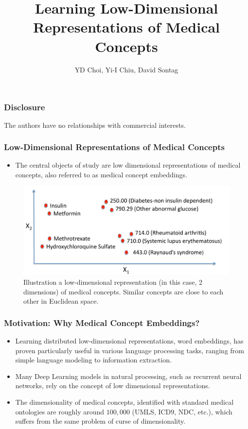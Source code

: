 \documentclass{beamer}
\title{Learning Low-Dimensional Representations
of Medical Concepts \\
}
\author{YD Choi, Yi-I Chiu, David Sontag }
\institute{Courant Institute of Mathematical 
Sciences, New York University}
\begin{document}
 
\frame{\titlepage} 

\begin{frame}
\frametitle{Disclosure}
\begin{center}
The authors have no relationships 
with commercial interests.
\end{center}
\end{frame}

\begin{frame}
\frametitle{Low-Dimensional Representations of 
Medical Concepts}
\begin{center}
\begin{itemize}
\item The central objects of study are
low dimensional representations of medical 
concepts, also referred to as medical concept
embeddings.
\end{itemize}
\bigskip

\begin{figure}[t]
    \centering 
    \includegraphics[width=.6\linewidth]{figs/illustration_of_embeddings.pdf}
    \caption{\centering 
\scriptsize Illustration a low-dimensional representation (in
      this case, 2 dimensions) of medical concepts. Similar concepts are close to each other in Euclidean space.
\label{fig:illustration_of_embeddings}}
\end{figure}
\end{center}
\end{frame}

\begin{frame}
\frametitle{Motivation: Why Medical Concept Embeddings?}
\begin{center}
\begin{itemize}
\item 
Learning distributed low-dimensional representations,
word embeddings, has proven particularly useful
in various language processing tasks, ranging from
simple language modeling to information extraction.

\bigskip

\item Many Deep Learning models in natural processing,
such as recurrent neural networks, 
rely on the concept of 
low dimensional representations.

\bigskip

\item The dimensionality of medical concepts, 
identified with standard medical ontologies are
roughly around $100,000$ (UMLS, ICD9, NDC, etc.),
which 
suffers from the same problem of curse of dimensionality. 

\end{itemize}
\end{center}
\end{frame}
\end{document}

